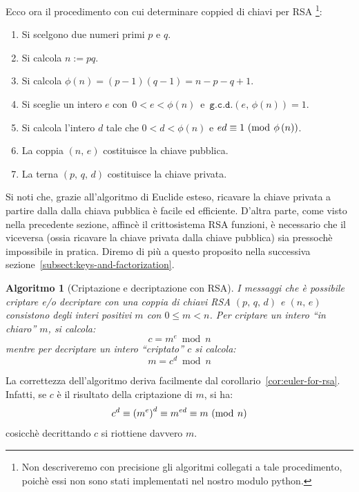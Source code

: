 \documentclass[pdflatex,11pt,a4paper,oneside]{article}
\let\OldEmph\emph
\renewcommand{\emph}[1]{\OldEmph{#1\/}}
\newcommand{\p}[1]{\left({#1}\right)}
\newcommand{\ephi}[1]{\ensuremath{\phi\p{#1}}}
\newcommand{\congruent}[0]{\equiv}
\newcommand{\mmodop}[0]{\ensuremath{\operatorname{mod}}}
\newcommand{\mmod}[1]{\ensuremath{\allowbreak\ (\mmodop\:{#1})}}
\newcommand{\rem}[2]{\ensuremath{{#1}\:\mmodop\:{#2}}}
\newcommand{\gcdop}[0]{\ensuremath{\mathtt{g.c.d.}}}
\newcommand{\xgcd}[1]{\ensuremath{\gcdop\left({#1}\right)}}
\renewcommand{\gcd}[2]{\xgcd{{#1},\,{#2}}}
\newtheorem{algorithm}[TheoremLike]{Algoritmo}
\begin{document}
\smallskip\noindent
Ecco ora il procedimento con cui determinare coppied di chiavi per RSA%
\footnote{Non descriveremo con precisione gli algoritmi collegati a tale
procedimento, poich\`e essi non sono stati implementati nel nostro modulo
python.}:
\begin{enumerate}\label{enum:rsa-keys}
 \item Si scelgono due numeri primi $p$ e $q$.
 \item Si calcola $n := pq$.
 \item Si calcola $\ephi{n} =  (p - 1) (q - 1) = n - p - q + 1$.
 \item Si sceglie un intero $e$ con \,$0 < e < \ephi{n}$\, e\,
       $\gcd{e}{\ephi{n}} = 1$.
 \item Si calcola l'intero $d$ tale che $0 < d < \ephi{n}$ e
       $ed \congruent 1 \mmod {\ephi{n}}$.
 \item La coppia $(n,\,e)$ costituisce la chiave pubblica.
 \item La terna $(p,\,q,\,d)$ costituisce la chiave privata.
\end{enumerate}

Si noti che, grazie all'algoritmo di Euclide esteso, ricavare la
chiave privata a partire dalla dalla chiava pubblica \`e facile ed
efficiente. D'altra parte, come visto nella precedente sezione,
affinc\`e il crittosistema RSA funzioni, \`e necessario che il
viceversa (ossia ricavare la chiave privata dalla chiave pubblica)
sia pressoch\`e impossibile in pratica. Diremo di pi\`u a questo
proposito nella successiva sezione~\eqref{subsect:keys-and-factorization}.

\begin{algorithm}[Criptazione e decriptazione con RSA]
I messaggi che \`e possibile criptare e/o decriptare con una coppia
di chiavi RSA $(p,\,q,\,d)$ e $(n,\,e)$ consistono degli interi positivi
$m$ con $0 \leq m < n$. Per \emph{criptare} un intero ``in chiaro'' $m$,
si calcola:
\begin{equation}\label{eq:rsa-crypt}
  c = \rem{m^e}{n}
\end{equation}
mentre per \emph{decriptare} un intero ``criptato'' $c$ si calcola:
\begin{equation}\label{eq:rsa-decrypt}
  m = \rem{c^d}{n}
\end{equation}
\end{algorithm}

La correttezza dell'algoritmo deriva facilmente dal
corollario~\eqref{cor:euler-for-rsa}.  Infatti, se $c$ \`e il
risultato della criptazione di $m$, si ha:
  $$c^d \congruent {\p{m^e}}^d \congruent m^{ed} \congruent m \mmod n$$
cosicch\`e decrittando $c$ si riottiene davvero $m$.
\end{document}
